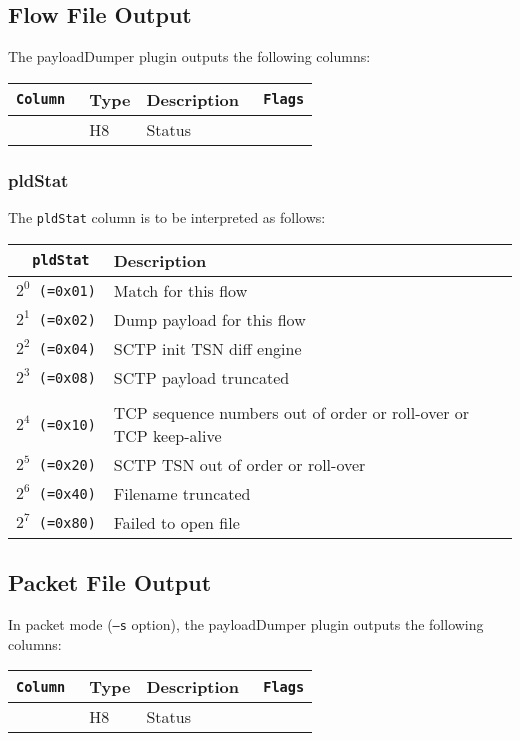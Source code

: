 \documentclass[documentation]{subfiles}
\begin{document}
\subsection{Flow File Output}
The payloadDumper plugin outputs the following columns:
\begin{longtable}{>{\tt}lll>{\tt\small}l}
    \toprule
    {\bf Column} & {\bf Type} & {\bf Description} & {\bf Flags}\\
    \midrule\endhead%
    \nameref{pldStat} & H8 & Status & \\
    \bottomrule
\end{longtable}

\subsubsection{pldStat}\label{pldStat}
The {\tt pldStat} column is to be interpreted as follows:
\begin{longtable}{>{\tt}rl}
    \toprule
    {\bf pldStat} & {\bf Description}\\
    \midrule\endhead%
    $2^0$ (=0x01) & Match for this flow\\
    $2^1$ (=0x02) & Dump payload for this flow\\
    $2^2$ (=0x04) & SCTP init TSN diff engine\\
    $2^3$ (=0x08) & SCTP payload truncated\\
    \\
    $2^4$ (=0x10) & TCP sequence numbers out of order or roll-over or TCP keep-alive\\
    $2^5$ (=0x20) & SCTP TSN out of order or roll-over\\
    $2^6$ (=0x40) & Filename truncated\\
    $2^7$ (=0x80) & Failed to open file\\
    \bottomrule
\end{longtable}

\subsection{Packet File Output}
In packet mode ({\tt --s} option), the payloadDumper plugin outputs the following columns:
\begin{longtable}{>{\tt}lll>{\tt\small}l}
    \toprule
    {\bf Column} & {\bf Type} & {\bf Description} & {\bf Flags}\\
    \midrule\endhead%
    \nameref{pldStat} & H8 & Status & \\
    \bottomrule
\end{longtable}
\end{document}

